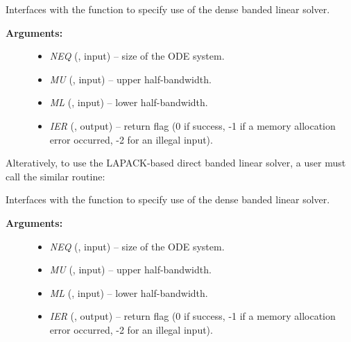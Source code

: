 \documentclass[letterpaper,10pt,english]{sphinxmanual}
\begin{document}
\begin{fulllineitems}
\label{f_interface/Usage:f/_/FARKBAND}
Interfaces with the {\hyperref[c_interface/User_callable:c.ARKBand]{\emph{}}} function to
specify use of the dense banded linear solver.
\begin{description}
\item[{\textbf{Arguments:}}] \leavevmode\begin{itemize}
\item {} 
\emph{NEQ} (, input) -- size of the ODE system.

\item {} 
\emph{MU} (, input) -- upper half-bandwidth.

\item {} 
\emph{ML} (, input) -- lower half-bandwidth.

\item {} 
\emph{IER} (, output) -- return flag (0 if success, -1 if a memory allocation
error occurred, -2 for an illegal input).

\end{itemize}

\end{description}

\end{fulllineitems}


Alteratively, to use the LAPACK-based direct banded linear solver, a
user must call the similar {\hyperref[f_interface/Usage:f/_/FARKLAPACKBAND]{\emph{}}} routine:

\begin{fulllineitems}
\label{f_interface/Usage:f/_/FARKLAPACKBAND}
Interfaces with the {\hyperref[c_interface/User_callable:c.ARKLapackBand]{\emph{}}} function
to specify use of the dense banded linear solver.
\begin{description}
\item[{\textbf{Arguments:}}] \leavevmode\begin{itemize}
\item {} 
\emph{NEQ} (, input) -- size of the ODE system.

\item {} 
\emph{MU} (, input) -- upper half-bandwidth.

\item {} 
\emph{ML} (, input) -- lower half-bandwidth.

\item {} 
\emph{IER} (, output) -- return flag (0 if success, -1 if a memory allocation
error occurred, -2 for an illegal input).

\end{itemize}

\end{description}

\end{fulllineitems}
\end{document}
